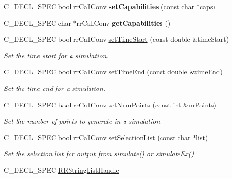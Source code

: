 \begin{DoxyCompactItemize}
\item 
\hypertarget{group__loadsave_ga320ffeeba3e5505371b52ce61715bf82}{
\-C\-\_\-\-D\-E\-C\-L\-\_\-\-S\-P\-E\-C bool rr\-Call\-Conv {\bfseries set\-Capabilities} (const char $\ast$caps)}
\label{group__loadsave_ga320ffeeba3e5505371b52ce61715bf82}

\item 
\hypertarget{group__loadsave_gaecce7b3dda3548fbe579922aadf25610}{
\-C\-\_\-\-D\-E\-C\-L\-\_\-\-S\-P\-E\-C char $\ast$rr\-Call\-Conv {\bfseries get\-Capabilities} ()}
\label{group__loadsave_gaecce7b3dda3548fbe579922aadf25610}

\item 
\-C\-\_\-\-D\-E\-C\-L\-\_\-\-S\-P\-E\-C bool rr\-Call\-Conv \hyperlink{group__loadsave_ga1a636a76ad610d99fe1c780bb3d9296d}{set\-Time\-Start} (const double \&time\-Start)
\begin{DoxyCompactList}\small\item\em \-Set the time start for a simulation. \end{DoxyCompactList}\item 
\-C\-\_\-\-D\-E\-C\-L\-\_\-\-S\-P\-E\-C bool rr\-Call\-Conv \hyperlink{group__loadsave_ga1313e21d622cd846bdd75071e965eb6c}{set\-Time\-End} (const double \&time\-End)
\begin{DoxyCompactList}\small\item\em \-Set the time end for a simulation. \end{DoxyCompactList}\item 
\-C\-\_\-\-D\-E\-C\-L\-\_\-\-S\-P\-E\-C bool rr\-Call\-Conv \hyperlink{group__loadsave_ga448ead53bb8913de664cc8ad675b4197}{set\-Num\-Points} (const int \&nr\-Points)
\begin{DoxyCompactList}\small\item\em \-Set the number of points to generate in a simulation. \end{DoxyCompactList}\item 
\-C\-\_\-\-D\-E\-C\-L\-\_\-\-S\-P\-E\-C bool rr\-Call\-Conv \hyperlink{group__loadsave_ga6465c94b6dfed39a6ef614bd0a68cb9b}{set\-Selection\-List} (const char $\ast$list)
\begin{DoxyCompactList}\small\item\em \-Set the selection list for output from \hyperlink{group__simulation_ga9f0555c11716daec2336d54d13facc57}{simulate()} or \hyperlink{group__simulation_ga9b87919e79f6eb0d7c77c3daa08d6baf}{simulate\-Ex()} \end{DoxyCompactList}\item 
\-C\-\_\-\-D\-E\-C\-L\-\_\-\-S\-P\-E\-C \hyperlink{rr__c__types_8h_abf561b014879247b7b92ee99c205de21}{\-R\-R\-String\-List\-Handle} \*

\end{DoxyCompactItemize}
